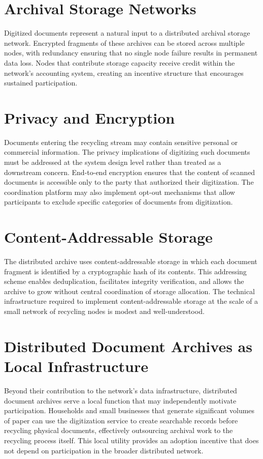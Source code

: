 \documentclass[12pt]{book}
\theoremstyle{definition}
\theoremstyle{remark}
\begin{document}
\section{Archival Storage Networks}

Digitized documents represent a natural input to a distributed
archival storage network. Encrypted fragments of these archives can
be stored across multiple nodes, with redundancy ensuring that no
single node failure results in permanent data loss. Nodes that
contribute storage capacity receive credit within the network's
accounting system, creating an incentive structure that encourages
sustained participation.

\section{Privacy and Encryption}

Documents entering the recycling stream may contain sensitive
personal or commercial information. The privacy implications of
digitizing such documents must be addressed at the system design
level rather than treated as a downstream concern. End-to-end
encryption ensures that the content of scanned documents is
accessible only to the party that authorized their digitization.
The coordination platform may also implement opt-out mechanisms
that allow participants to exclude specific categories of documents
from digitization.

\section{Content-Addressable Storage}

The distributed archive uses content-addressable storage in which
each document fragment is identified by a cryptographic hash of
its contents. This addressing scheme enables deduplication,
facilitates integrity verification, and allows the archive to
grow without central coordination of storage allocation. The
technical infrastructure required to implement content-addressable
storage at the scale of a small network of recycling nodes is
modest and well-understood.

\section{Distributed Document Archives as Local Infrastructure}

Beyond their contribution to the network's data infrastructure,
distributed document archives serve a local function that may
independently motivate participation. Households and small
businesses that generate significant volumes of paper can use the
digitization service to create searchable records before recycling
physical documents, effectively outsourcing archival work to
the recycling process itself. This local utility provides an
adoption incentive that does not depend on participation in the
broader distributed network.
\end{document}
